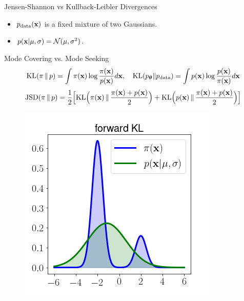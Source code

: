 \documentclass{beamer}
\begin{document}
\begin{frame}{Jensen-Shannon vs Kullback-Leibler Divergences}
	\begin{itemize}
		\item $p_{\text{data}}(\mathbf{x})$ is a fixed mixture of two Gaussians.
		\item $p(\mathbf{x} | \mu, \sigma) = \mathcal{N}(\mu, \sigma^2)$.
	\end{itemize}
	\begin{block}{Mode Covering vs. Mode Seeking}
		\vspace{-0.7cm}
		\[
			\mathrm{KL}(\pi \,\|\, p) = \int \pi(\mathbf{x}) \log \frac{\pi(\mathbf{x})}{p(\mathbf{x})}d\mathbf{x}, \quad \mathrm{KL}(p_{\boldsymbol{\theta}} \| p_{\text{data}}) = \int p(\mathbf{x}) \log \frac{p(\mathbf{x})}{\pi(\mathbf{x})}d\mathbf{x}
		\]
		\[
			\mathrm{JSD}(\pi \,\|\, p) = \frac{1}{2} \Bigl[\mathrm{KL} \Bigl(\pi(\mathbf{x}) \,\|\, \frac{\pi(\mathbf{x}) + p(\mathbf{x})}{2}\Bigr) + \mathrm{KL} \Bigl(p(\mathbf{x}) \,\|\, \frac{\pi(\mathbf{x}) + p(\mathbf{x})}{2}\Bigr) \Bigr]
		\]
		\vspace{-0.7cm}
		\eqpause
		\begin{minipage}[t]{0.33\columnwidth}
			\begin{figure}
				\includegraphics[width=\linewidth]{figs/forward_KL}
			\end{figure}
		\end{minipage}%
		\begin{minipage}[t]{0.33\columnwidth}
			\begin{figure}

\end{figure}
\end{minipage}
\end{block}
\end{frame}
\end{document}
